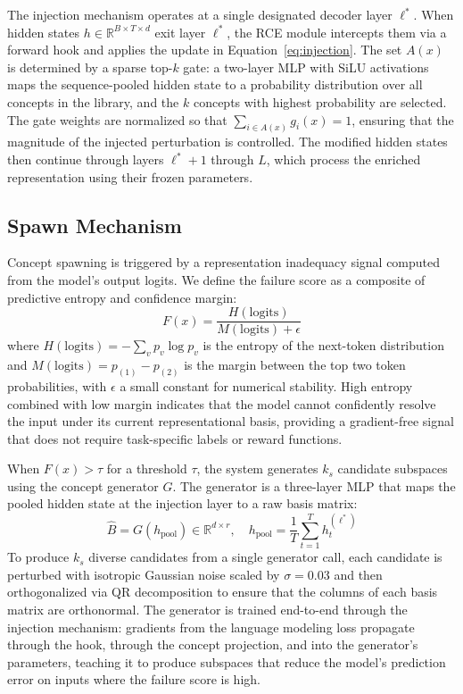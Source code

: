 \documentclass[11pt]{article}
\begin{document}
The injection mechanism operates at a single designated decoder layer $\ell^*$. When hidden states $h \in \mathbb{R}^{B \times T \times d}$ exit layer $\ell^*$, the RCE module intercepts them via a forward hook and applies the update in Equation~\ref{eq:injection}. The set $A(x)$ is determined by a sparse top-$k$ gate: a two-layer MLP with SiLU activations maps the sequence-pooled hidden state to a probability distribution over all concepts in the library, and the $k$ concepts with highest probability are selected. The gate weights are normalized so that $\sum_{i \in A(x)} g_i(x) = 1$, ensuring that the magnitude of the injected perturbation is controlled. The modified hidden states then continue through layers $\ell^* + 1$ through $L$, which process the enriched representation using their frozen parameters.

\subsection{Spawn Mechanism}

Concept spawning is triggered by a representation inadequacy signal computed from the model's output logits. We define the failure score as a composite of predictive entropy and confidence margin:
\begin{equation}
F(x) = \frac{H(\text{logits})}{M(\text{logits}) + \epsilon}
\label{eq:failure}
\end{equation}
where $H(\text{logits}) = -\sum_v p_v \log p_v$ is the entropy of the next-token distribution and $M(\text{logits}) = p_{(1)} - p_{(2)}$ is the margin between the top two token probabilities, with $\epsilon$ a small constant for numerical stability. High entropy combined with low margin indicates that the model cannot confidently resolve the input under its current representational basis, providing a gradient-free signal that does not require task-specific labels or reward functions.

When $F(x) > \tau$ for a threshold $\tau$, the system generates $k_s$ candidate subspaces using the concept generator $G$. The generator is a three-layer MLP that maps the pooled hidden state at the injection layer to a raw basis matrix:
\begin{equation}
\hat{B} = G(h_{\text{pool}}) \in \mathbb{R}^{d \times r}, \quad h_{\text{pool}} = \frac{1}{T}\sum_{t=1}^{T} h_t^{(\ell^*)}
\end{equation}
To produce $k_s$ diverse candidates from a single generator call, each candidate is perturbed with isotropic Gaussian noise scaled by $\sigma = 0.03$ and then orthogonalized via QR decomposition to ensure that the columns of each basis matrix are orthonormal. The generator is trained end-to-end through the injection mechanism: gradients from the language modeling loss propagate through the hook, through the concept projection, and into the generator's parameters, teaching it to produce subspaces that reduce the model's prediction error on inputs where the failure score is high.
\end{document}
